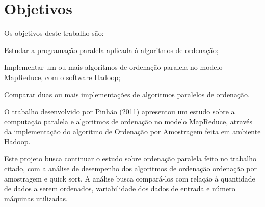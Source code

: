 
\section{Objetivos}

Os objetivos deste trabalho são:

\begin{packed_enum}
\item Estudar a programação paralela aplicada à algoritmos de ordenação;
\item Implementar um ou mais algoritmos de ordenação paralela no modelo MapReduce, com o software Hadoop;
\item Comparar duas ou mais implementações de algoritmos paralelos de ordenação.
\end{packed_enum}

O trabalho desenvolvido por Pinhão (2011) apresentou um estudo sobre a computação paralela e algoritmos de ordenação no modelo MapReduce, através da implementação do algoritmo de Ordenação por Amostragem feita em ambiente Hadoop. 

Este projeto busca continuar o estudo sobre ordenação paralela feito no trabalho citado, com a análise de desempenho dos algoritmos de ordenação ordenação por amostragem e quick sort. A análise busca compará-los com relação à quantidade de dados a serem ordenados, variabilidade dos dados de entrada e número máquinas utilizadas. 


